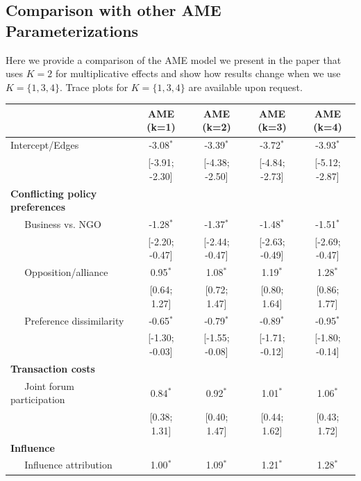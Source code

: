 \documentclass[12pt,onesided,pdflatex]{amsart}
\begin{document}
\FloatBarrier

\clearpage
\subsection{Comparison with other AME Parameterizations}
\label{sec:ameVsAmeAppendix}

Here we provide a comparison of the AME model we present in the paper that uses $K=2$ for multiplicative effects and show how results change when we use $K=\{1,3,4\}$. Trace plots for $K=\{1,3,4\}$ are available upon request.

\begin{table}[ht]
\centering
\begingroup\tiny
\begin{tabular}{lcccc}
   & AME (k=1) & AME (k=2) & AME (k=3) & AME (k=4) \\ 
  \hline
\hline
Intercept/Edges & -3.08$^{\ast}$ & -3.39$^{\ast}$ & -3.72$^{\ast}$ & -3.93$^{\ast}$ \\ 
   & [-3.91; -2.30] & [-4.38; -2.50] & [-4.84; -2.73] & [-5.12; -2.87] \\ 
  \textbf{Conflicting policy preferences} &  &  &  &  \\ 
  $\;\;\;\;$ Business vs. NGO & -1.28$^{\ast}$ & -1.37$^{\ast}$ & -1.48$^{\ast}$ & -1.51$^{\ast}$ \\ 
   & [-2.20; -0.47] & [-2.44; -0.47] & [-2.63; -0.49] & [-2.69; -0.47] \\ 
  $\;\;\;\;$ Opposition/alliance & 0.95$^{\ast}$ & 1.08$^{\ast}$ & 1.19$^{\ast}$ & 1.28$^{\ast}$ \\ 
   & [0.64; 1.27] & [0.72; 1.47] & [0.80; 1.64] & [0.86; 1.77] \\ 
  $\;\;\;\;$ Preference dissimilarity & -0.65$^{\ast}$ & -0.79$^{\ast}$ & -0.89$^{\ast}$ & -0.95$^{\ast}$ \\ 
   & [-1.30; -0.03] & [-1.55; -0.08] & [-1.71; -0.12] & [-1.80; -0.14] \\ 
  \textbf{Transaction costs} &  &  &  &  \\ 
  $\;\;\;\;$ Joint forum participation & 0.84$^{\ast}$ & 0.92$^{\ast}$ & 1.01$^{\ast}$ & 1.06$^{\ast}$ \\ 
   & [0.38; 1.31] & [0.40; 1.47] & [0.44; 1.62] & [0.43; 1.72] \\ 
  \textbf{Influence} &  &  &  &  \\ 
  $\;\;\;\;$ Influence attribution & 1.00$^{\ast}$ & 1.09$^{\ast}$ & 1.21$^{\ast}$ & 1.28$^{\ast}$ \\ 

\end{tabular}
\end{table}
\end{document}
